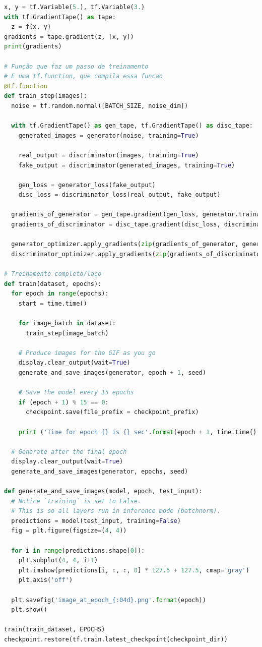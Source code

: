 \begin{lstlisting}[language=Python, style=input]
x, y = tf.Variable(5.), tf.Variable(3.)
with tf.GradientTape() as tape:
  z = f(x, y)
gradients = tape.gradient(z, [x, y])
print(gradients)

# Função que faz um passo de treinamento
# E uma tf.function, que compila essa funcao
@tf.function
def train_step(images):
  noise = tf.random.normal([BATCH_SIZE, noise_dim])

  with tf.GradientTape() as gen_tape, tf.GradientTape() as disc_tape:
    generated_images = generator(noise, training=True)

    real_output = discriminator(images, training=True)
    fake_output = discriminator(generated_images, training=True)

    gen_loss = generator_loss(fake_output)
    disc_loss = discriminator_loss(real_output, fake_output)

  gradients_of_generator = gen_tape.gradient(gen_loss, generator.trainable_variables)
  gradients_of_discriminator = disc_tape.gradient(disc_loss, discriminator.trainable_variables)

  generator_optimizer.apply_gradients(zip(gradients_of_generator, generator.trainable_variables))
  discriminator_optimizer.apply_gradients(zip(gradients_of_discriminator, discriminator.trainable_variables))

# Treinamento completo/laço
def train(dataset, epochs):
  for epoch in range(epochs):
    start = time.time()

    for image_batch in dataset:
      train_step(image_batch)

    # Produce images for the GIF as you go
    display.clear_output(wait=True)
    generate_and_save_images(generator, epoch + 1, seed)

    # Save the model every 15 epochs
    if (epoch + 1) % 15 == 0:
      checkpoint.save(file_prefix = checkpoint_prefix)

    print ('Time for epoch {} is {} sec'.format(epoch + 1, time.time() - start))

  # Generate after the final epoch
  display.clear_output(wait=True)
  generate_and_save_images(generator, epochs, seed)

def generate_and_save_images(model, epoch, test_input):
  # Notice `training` is set to False.
  # This is so all layers run in inference mode (batchnorm).
  predictions = model(test_input, training=False)
  fig = plt.figure(figsize=(4, 4))

  for i in range(predictions.shape[0]):
    plt.subplot(4, 4, i+1)
    plt.imshow(predictions[i, :, :, 0] * 127.5 + 127.5, cmap='gray')
    plt.axis('off')

  plt.savefig('image_at_epoch_{:04d}.png'.format(epoch))
  plt.show()

train(train_dataset, EPOCHS)
checkpoint.restore(tf.train.latest_checkpoint(checkpoint_dir))
\end{lstlisting}

